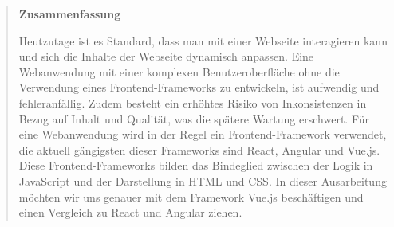 \documentclass[%
	BCOR=8.25mm,         %
	DIV=12,              %
	parskip=half,				 %
	bibliography=totoc,	 %
	headsepline=on,      %
	]{scrbook}
\begin{document}
\pagestyle{empty}
\begin{quote}
	\vspace*{4cm}

	\begin{center}
		\textbf{\Large\sffamily Zusammenfassung}
	\end{center}
	Heutzutage ist es Standard, dass man mit einer Webseite interagieren kann und sich die Inhalte der Webseite dynamisch anpassen.
	Eine Webanwendung mit einer komplexen Benutzeroberfläche ohne die Verwendung eines Frontend-Frameworks zu entwickeln, ist aufwendig und fehleranfällig.
	Zudem besteht ein erhöhtes Risiko von Inkonsistenzen in Bezug auf Inhalt und Qualität, was die spätere Wartung erschwert.
	Für eine Webanwendung wird in der Regel ein Frontend-Framework verwendet, die aktuell gängigsten dieser Frameworks sind React, Angular und Vue.js.
	Diese Frontend-Frameworks bilden das Bindeglied zwischen der Logik in JavaScript und der Darstellung in HTML und CSS.
	In dieser Ausarbeitung möchten wir uns genauer mit dem Framework Vue.js beschäftigen und einen Vergleich zu React und Angular ziehen.

	
\end{quote}
\cleardoubleemptypage

\tableofcontents

\listoffigures
\listoftables
\lstlistoflistings

\mainmatter 
\pagestyle{headings}






%
%
%

\backmatter 

\appendix
%


\end{document}
